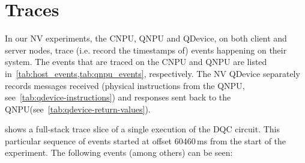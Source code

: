 \section{Traces}
\label{qnodeos:sec:traces}

In our \ac{NV} experiments, the \ac{CNPU}, \ac{QNPU} and \ac{QDevice}, on both client and server nodes, trace (i.e. record the timestamps of) events happening on their system. The events that are traced on the \ac{CNPU} and \ac{QNPU} are listed in~\cref{tab:host_events,tab:qnpu_events}, respectively. The \ac{NV} \ac{QDevice} separately records messages received (physical instructions from the \ac{QNPU}, see~\cref{tab:qdevice-instructions}) and responses sent back to the \ac{QNPU}(see~\cref{tab:qdevice-return-values}).

 shows a full-stack trace slice of a single execution of the \ac{DQC} circuit. This particular sequence of events started at offset 60460\,ms from the start of the experiment. The following events (among others) can be seen:
%
